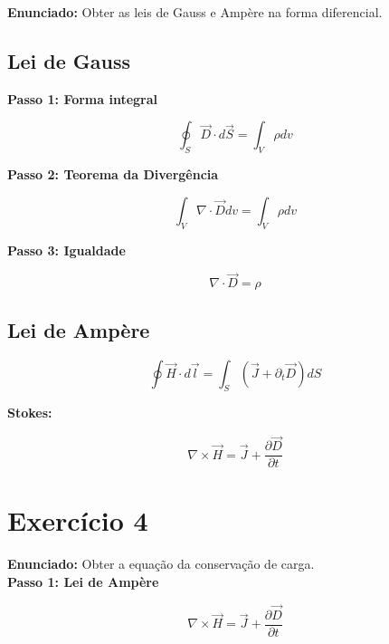 \documentclass[12pt,a4paper]{article}
\begin{document}
\textbf{Enunciado:} Obter as leis de Gauss e Ampère na forma diferencial.

\subsection*{Lei de Gauss}

\textbf{Passo 1: Forma integral}

\begin{equation}
\oint_S \vec{D} \cdot d\vec{S} = \int_V \rho dv
\end{equation}

\textbf{Passo 2: Teorema da Divergência}

\begin{equation}
\int_V \nabla \cdot \vec{D} dv = \int_V \rho dv
\end{equation}

\textbf{Passo 3: Igualdade}

\begin{equation}
\nabla \cdot \vec{D} = \rho
\end{equation}

\subsection*{Lei de Ampère}

\begin{equation}
\oint \vec{H} \cdot d\vec{l} = \int_S (\vec{J} + \partial_t \vec{D}) dS
\end{equation}

\textbf{Stokes:}

\begin{equation}
\nabla \times \vec{H} = \vec{J} + \frac{\partial \vec{D}}{\partial t}
\end{equation}

\newpage

\section*{Exercício 4}

\textbf{Enunciado:} Obter a equação da conservação de carga. \\

\textbf{Passo 1: Lei de Ampère}

\begin{equation}
\nabla \times \vec{H} = \vec{J} + \frac{\partial \vec{D}}{\partial t}
\end{equation}
\end{document}

